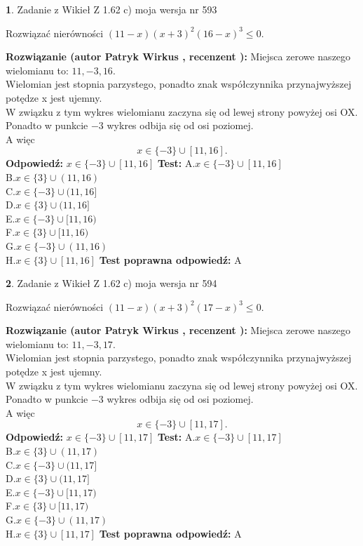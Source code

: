 \documentclass[12pt, a4paper]{article}
\theoremstyle{definition} %
\newtheorem{zad}{}
\newcommand{\zadStart}[1]{\begin{zad}#1\newline}
\newcommand{\zadStop}{\end{zad}}
\newcommand{\rozwStart}[2]{\noindent \textbf{Rozwiązanie (autor #1 , recenzent #2): }\newline}
\newcommand{\rozwStop}{\newline}
\newcommand{\odpStart}{\noindent \textbf{Odpowiedź:}\newline}
\newcommand{\odpStop}{\newline}
\newcommand{\testStart}{\noindent \textbf{Test:}\newline}
\newcommand{\testStop}{\newline}
\newcommand{\kluczStart}{\noindent \textbf{Test poprawna odpowiedź:}\newline}
\newcommand{\kluczStop}{\newline}
\begin{document}
\zadStart{Zadanie z Wikieł Z 1.62 c) moja wersja nr 593}

Rozwiązać nierówności $(11-x)(x+3)^{2}(16-x)^{3}\le0$.
\zadStop
\rozwStart{Patryk Wirkus}{}
Miejsca zerowe naszego wielomianu to: $11, -3, 16$.\\
Wielomian jest stopnia parzystego, ponadto znak współczynnika przy\linebreak najwyższej potędze x jest ujemny.\\ W związku z tym wykres wielomianu zaczyna się od lewej strony powyżej osi OX.\\
Ponadto w punkcie $-3$ wykres odbija się od osi poziomej.\\
A więc $$x \in \{-3\} \cup [11,16].$$
\rozwStop
\odpStart
$x \in \{-3\} \cup [11,16]$
\odpStop
\testStart
A.$x \in \{-3\} \cup [11,16]$\\
B.$x \in \{3\} \cup (11,16)$\\
C.$x \in \{-3\} \cup (11,16]$\\
D.$x \in \{3\} \cup (11,16]$\\
E.$x \in \{-3\} \cup [11,16)$\\
F.$x \in \{3\} \cup [11,16)$\\
G.$x \in \{-3\} \cup (11,16)$\\
H.$x \in \{3\} \cup [11,16]$
\testStop
\kluczStart
A
\kluczStop



\zadStart{Zadanie z Wikieł Z 1.62 c) moja wersja nr 594}

Rozwiązać nierówności $(11-x)(x+3)^{2}(17-x)^{3}\le0$.
\zadStop
\rozwStart{Patryk Wirkus}{}
Miejsca zerowe naszego wielomianu to: $11, -3, 17$.\\
Wielomian jest stopnia parzystego, ponadto znak współczynnika przy\linebreak najwyższej potędze x jest ujemny.\\ W związku z tym wykres wielomianu zaczyna się od lewej strony powyżej osi OX.\\
Ponadto w punkcie $-3$ wykres odbija się od osi poziomej.\\
A więc $$x \in \{-3\} \cup [11,17].$$
\rozwStop
\odpStart
$x \in \{-3\} \cup [11,17]$
\odpStop
\testStart
A.$x \in \{-3\} \cup [11,17]$\\
B.$x \in \{3\} \cup (11,17)$\\
C.$x \in \{-3\} \cup (11,17]$\\
D.$x \in \{3\} \cup (11,17]$\\
E.$x \in \{-3\} \cup [11,17)$\\
F.$x \in \{3\} \cup [11,17)$\\
G.$x \in \{-3\} \cup (11,17)$\\
H.$x \in \{3\} \cup [11,17]$
\testStop
\kluczStart
A
\kluczStop
\end{document}
